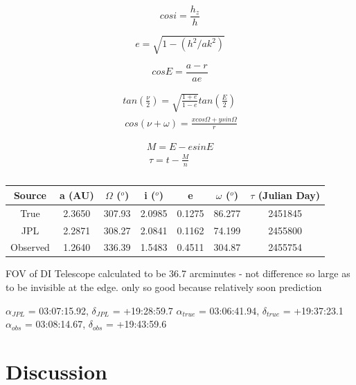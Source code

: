 \documentclass[a4paper,12pt]{article}
\begin{document}
\begin{equation}
cosi = \frac{h_z}{h}
\label{eqn:inclination}
\end{equation}

\begin{equation}
e = \sqrt{1-(h^2/ak^2)}
\label{eqn:eccentricity}
\end{equation}

\begin{equation}
cosE = \frac{a-r}{ae}
\label{eqn:eccentricanomaly}
\end{equation}

\begin{eqnarray}
\label{eqn:trueanomaly}
tan\left(\frac{\nu}{2}\right) = \sqrt{\frac{1+e}{1-e}}tan\left(\frac{E}{2}\right)\\\
cos(\nu+\omega) = \frac{xcos\Omega + ysin\Omega}{r}
\label{eqn:argperihelion}
\end{eqnarray}

\begin{eqnarray}
\label{eqn:meananomaly}
M = E - esinE\\\
\tau = t - \frac{M}{n}
\label{eqn:timeperihelion}
\end{eqnarray}

\begin{table}[!htbp]
	\centering
	\begin{tabular}{c||c||c||c||c||c||c}
	\hline
	Source & a (AU) & $\Omega$ ($^o$) & i ($^o$) & e & $\omega$ ($^o$) & $\tau$ (Julian Day)\\
	\hline
	True & 2.3650 & 307.93 & 2.0985 & 0.1275 & 86.277 & 2451845\\
	\hline
	JPL & 2.2871 & 308.27 & 2.0841 & 0.1162 & 74.199 & 2455800\\
	\hline
	Observed & 1.2640 & 336.39 & 1.5483 & 0.4511 & 304.87 & 2455754\\
	\end{tabular}
	\caption{}
	\label{tab:elements}
\end{table}

FOV of DI Telescope calculated to be 36.7 arcminutes - not difference so large as to be invisible at the edge. only so good because relatively soon prediction

$\alpha_{JPL}$ = 03:07:15.92, $\delta_{JPL}$ = +19:28:59.7 
$\alpha_{true}$ = 03:06:41.94, $\delta_{true}$ = +19:37:23.1
$\alpha_{obs}$ = 03:08:14.67, $\delta_{obs}$ = +19:43:59.6

\section{Discussion}
\label{sec:discussion}
\end{document}
